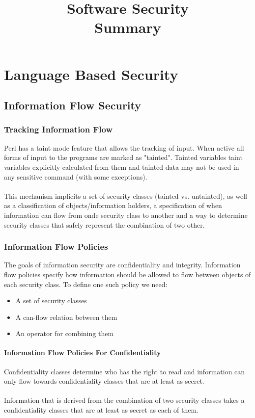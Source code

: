 \documentclass[10pt,a4paper]{report}
\title{\LARGE{Software Security} \\ \vspace{0.5cm} \normalsize{Summary}}
\date{}
\begin{document}
\maketitle
\tableofcontents

\chapter{Language Based Security}
\section{Information Flow Security}
\subsection{Tracking Information Flow}
Perl has a taint mode feature that allows the tracking of input. When active all forms of input to the programs are marked as "tainted". Tainted variables taint variables explicitly calculated from them and tainted data may not be used in any sensitive command (with some exceptions).\\
\\
This mechanism implicits a set of security classes (tainted vs. untainted), as well as a classification of objects/information holders, a specification of when information can flow from onde security class to another and a way to determine security classes that safely represent the combination of two other.
\subsection{Information Flow Policies}
The goals of information security are confidentiality and integrity. Information flow policies specify how information should be allowed to flow between objects of each security class. To define one such policy we need:
\begin{itemize}
\item A set of security classes
\item A can-flow relation between them
\item An operator for combining them
\end{itemize}
\subsubsection{Information Flow Policies For Confidentiality}
Confidentiality classes determine who has the right to read and information can only flow towards confidentiality classes that are at least as secret.\\
\\
Information that is derived from the combination of two security classes takes a confidentiality classes that are at least as secret as each of them.
\end{document}
